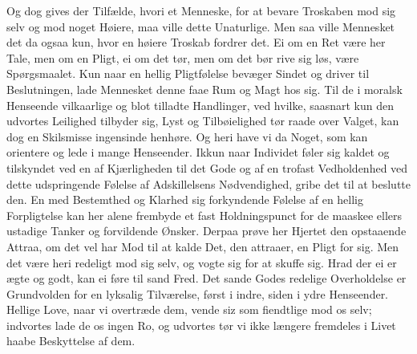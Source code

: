 \documentclass[12pt,a4paper]{book}
\newcommand{\apage}[1]{\marginnote{\footnotesize\textit{[#1]}}}
\begin{document}
Og dog gives der Tilfælde, hvori et Menneske, for at bevare Troskaben
mod sig selv og mod noget Høiere, maa ville dette Unaturlige. Men saa
ville Mennesket det da ogsaa kun, hvor en høiere Troskab fordrer det. Ei
om en Ret være her Tale, men om en Pligt, ei om det tør, men om det bør
rive sig løs, være Spørgsmaalet. Kun naar en hellig Pligtfølelse bevæger
Sindet og driver til Beslutningen, lade Mennesket denne faae Rum og Magt
hos sig. Til de i moralsk Henseende vilkaarlige og blot tilladte
Handlinger, ved hvilke, saasnart kun den udvortes Leilighed tilbyder sig,
Lyst og Tilbøielighed tør raade over Valget, kan dog en Skilsmisse
ingensinde henhøre. Og heri have vi da \apage{141} Noget, som kan orientere og lede i
mange Henseender. Ikkun naar Individet føler sig kaldet og tilskyndet ved
en af Kjærligheden til det Gode og af en trofast Vedholdenhed ved dette
udspringende Følelse af Adskillelsens Nødvendighed, gribe det til at
beslutte den. En med Bestemthed og Klarhed sig forkyndende Følelse af en
hellig Forpligtelse kan her alene frembyde et fast Holdningspunct for de
maaskee ellers ustadige Tanker og forvildende Ønsker. Derpaa prøve her
Hjertet den opstaaende Attraa, om det vel har Mod til at kalde Det, den
attraaer, en Pligt for sig. Men det være heri redeligt mod sig selv, og
vogte sig for at skuffe sig. Hrad der ei er ægte og godt, kan ei føre til
sand Fred. Det sande Godes redelige Overholdelse er Grundvolden for en
lyksalig Tilværelse, først i indre, siden i ydre Henseender. Hellige
Love, naar vi overtræde dem, vende siz som fiendtlige mod os selv;
indvortes lade de os ingen Ro, og udvortes tør vi ikke længere fremdeles
i Livet haabe Beskyttelse af dem.
\end{document}
